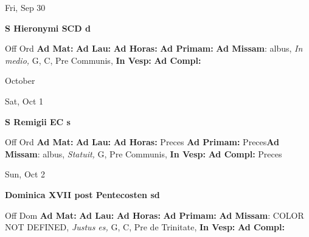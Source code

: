 \documentclass[10pt]{memoir}
\begin{document}
\begin{center}
\begin{minipage}{3.5in}
\vspace{2em}
\begin{center}Fri, Sep 30
\end{center}
\textbf{ \large S Hieronymi SCD
\textnormal{\normalsize d}}

\begin{justify}Off Ord
\textbf{Ad Mat: }
\textbf{Ad Lau: }
\textbf{Ad Horas: }
\textbf{Ad Primam: }\textbf{Ad Missam}: albus, \textit{In medio,} G, C, Pre Communis, 
\textbf{In Vesp: }
\textbf{Ad Compl: }
\end{justify}
\end{minipage}
\end{center}

\begin{center}
\pagebreak
\thispagestyle{empty}
{\Huge October}
\end{center}
                    
\begin{center}
\begin{minipage}{3.5in}
\vspace{2em}
\begin{center}Sat, Oct 1
\end{center}
\textbf{ \large S Remigii EC
\textnormal{\normalsize s}}

\begin{justify}Off Ord
\textbf{Ad Mat: }
\textbf{Ad Lau: }
\textbf{Ad Horas: }Preces
\textbf{Ad Primam: }Preces\textbf{Ad Missam}: albus, \textit{Statuit,} G, Pre Communis, 
\textbf{In Vesp: }
\textbf{Ad Compl: }Preces
\end{justify}
\end{minipage}
\end{center}

\begin{center}
\begin{minipage}{3.5in}
\vspace{2em}
\begin{center}Sun, Oct 2
\end{center}
\textbf{ \large Dominica XVII post Pentecosten
\textnormal{\normalsize sd}}

\begin{justify}Off Dom
\textbf{Ad Mat: }
\textbf{Ad Lau: }
\textbf{Ad Horas: }
\textbf{Ad Primam: }\textbf{Ad Missam}: COLOR NOT DEFINED, \textit{Justus es,} G, C, Pre de Trinitate, 
\textbf{In Vesp: }
\textbf{Ad Compl: }
\end{justify}
\end{minipage}
\end{center}
\end{document}
